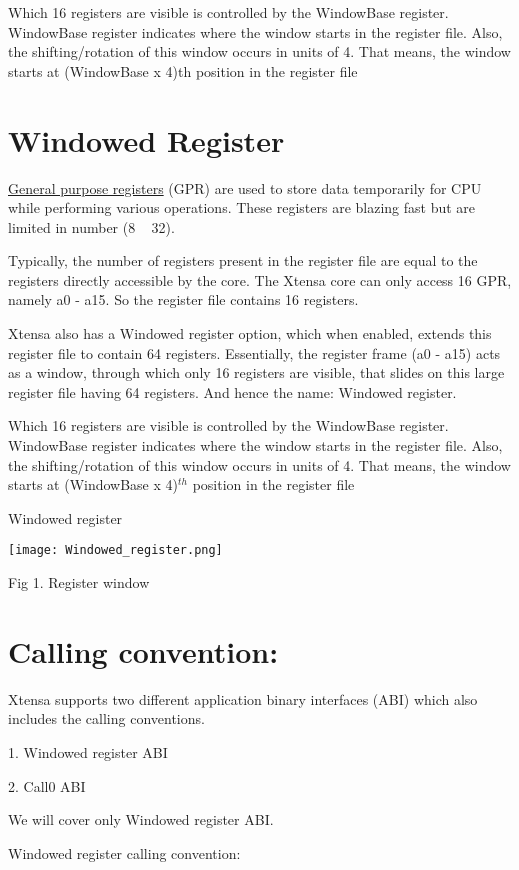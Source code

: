   Which 16 registers are visible is controlled by the WindowBase register. WindowBase register indicates where the window starts in the register file. Also, the shifting/rotation of this window occurs in units of 4. That means, the window starts at (WindowBase x 4)th position in the register file

\section{Windowed Register}

\underline{General purpose registers} (GPR) are used to store data temporarily for CPU while performing various operations. These registers are blazing fast but are limited in number (8 ~ 32).

Typically, the number of registers present in the register file are equal to the registers directly accessible by the core. The Xtensa core can only access 16 GPR, namely a0 - a15. So the register file contains 16 registers.

Xtensa also has a Windowed register option, which when enabled, extends this register file to contain 64 registers. Essentially, the register frame (a0 - a15) acts as a window, through which only 16 registers are visible, that slides on this large register file having 64 registers. And hence the name: Windowed register.

Which 16 registers are visible is controlled by the WindowBase register. WindowBase register indicates where the window starts in the register file. Also, the shifting/rotation of this window occurs in units of 4. That means, the window starts at (WindowBase x 4)$^{th}$ position in the register file

Windowed register


\texttt{[image: Windowed\_register.png]}

Fig 1. Register window

\section*{Calling convention:}

 Xtensa supports two different application binary interfaces (ABI) which also includes the calling conventions.
 
1. Windowed register ABI

2. Call0 ABI

We will cover only Windowed register ABI.

Windowed register calling convention:

